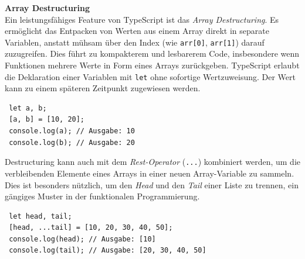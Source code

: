 \textbf{Array Destructuring}\\
Ein leistungsfähiges Feature von TypeScript ist das \textit{Array Destructuring}. Es ermöglicht das Entpacken von Werten aus einem Array direkt in separate Variablen, anstatt mühsam über den Index (wie \texttt{arr[0]}, \texttt{arr[1]}) darauf zuzugreifen. Dies führt zu kompakterem und lesbarerem Code, insbesondere wenn Funktionen mehrere Werte in Form eines Arrays zurückgeben. TypeScript erlaubt die Deklaration einer Variablen mit \texttt{let} ohne sofortige Wertzuweisung. Der Wert kann zu einem späteren Zeitpunkt zugewiesen werden.

\begin{verbatim}
 let a, b;
 [a, b] = [10, 20];
 console.log(a); // Ausgabe: 10
 console.log(b); // Ausgabe: 20
\end{verbatim}

Destructuring kann auch mit dem \textit{Rest-Operator} (\texttt{...}) kombiniert werden, um die verbleibenden Elemente eines Arrays in einer neuen Array-Variable zu sammeln. Dies ist besonders nützlich, um den \emph{Head} und den \emph{Tail} einer Liste zu trennen, ein gängiges Muster in der funktionalen Programmierung.
\begin{verbatim}
 let head, tail;
 [head, ...tail] = [10, 20, 30, 40, 50];
 console.log(head); // Ausgabe: [10]
 console.log(tail); // Ausgabe: [20, 30, 40, 50]
\end{verbatim}

